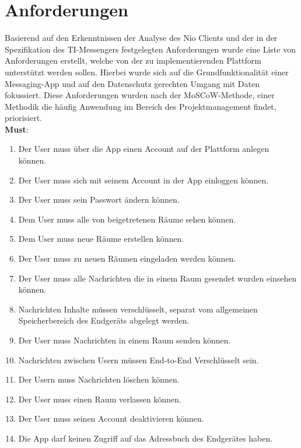    \section{Anforderungen}\label{sec:anforderungen}
    Basierend auf den Erkenntnissen der Analyse des Nio Clients und der in der Spezifikation des TI-Messengers festgelegten Anforderungen wurde eine Liste von Anforderungen erstellt, welche von der zu implementierenden Plattform unterstützt werden sollen.
    Hierbei wurde sich auf die Grundfunktionalität einer Messaging-App und auf den Datenschutz gerechten Umgang mit Daten fokussiert.
    Diese Anforderungen wurden nach der MoSCoW-Methode, einer Methodik die häufig Anwendung im Bereich des Projektmanagement findet, priorisiert.\\
    \textbf{Must}:
    \begin{enumerate}[label={\roman*.}, leftmargin=2.5cm]
        \item Der User muss über die App einen Account auf der Plattform anlegen können.
        \item Der User muss sich mit seinem Account in der App einloggen können.
        \item Der User muss sein Passwort ändern können.
        \item Dem User muss alle von beigetretenen Räume sehen können.
        \item Dem User muss neue Räume erstellen können.
        \item Der User muss zu neuen Räumen eingeladen werden können.
        \item Der User muss alle Nachrichten die in einem Raum gesendet wurden einsehen können.
        \item Nachrichten Inhalte müssen verschlüsselt, separat vom allgemeinen Speicherbereich des Endgeräts abgelegt werden.
        \item Der User muss Nachrichten in einem Raum senden können.
        \item Nachrichten zwischen Usern müssen End-to-End Verschlüsselt sein.
        \item Der Usern muss Nachrichten löschen können.
        \item Der User muss einen Raum verlassen können.
        \item Der User muss seinen Account deaktivieren können.
        \item Die App darf keinen Zugriff auf das Adressbuch des Endgerätes haben.
    \end{enumerate}


